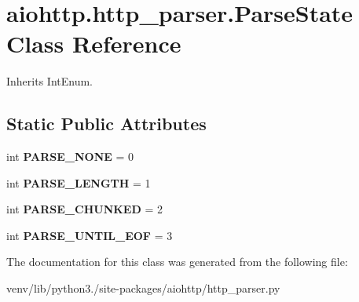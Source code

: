 \hypertarget{classaiohttp_1_1http__parser_1_1_parse_state}{}\section{aiohttp.\+http\+\_\+parser.\+Parse\+State Class Reference}
\label{classaiohttp_1_1http__parser_1_1_parse_state}


Inherits Int\+Enum.

\subsection*{Static Public Attributes}
\begin{DoxyCompactItemize}
\item 
\mbox{\label{classaiohttp_1_1http__parser_1_1_parse_state_a7d81ed0e03e3556e5d9611f1b1e2e6ba}} 
int {\bfseries P\+A\+R\+S\+E\+\_\+\+N\+O\+NE} = 0
\item 
\mbox{\label{classaiohttp_1_1http__parser_1_1_parse_state_a39a88e78db18fcf547b1ff9e46424c58}} 
int {\bfseries P\+A\+R\+S\+E\+\_\+\+L\+E\+N\+G\+TH} = 1
\item 
\mbox{\label{classaiohttp_1_1http__parser_1_1_parse_state_a1f4d111ceee57b123abf0433104d811d}} 
int {\bfseries P\+A\+R\+S\+E\+\_\+\+C\+H\+U\+N\+K\+ED} = 2
\item 
\mbox{\label{classaiohttp_1_1http__parser_1_1_parse_state_a1640b917e6dec531e1b352b6a3aa08bb}} 
int {\bfseries P\+A\+R\+S\+E\+\_\+\+U\+N\+T\+I\+L\+\_\+\+E\+OF} = 3
\end{DoxyCompactItemize}


The documentation for this class was generated from the following file\+:\begin{DoxyCompactItemize}
\item 
venv/lib/python3./site-\/packages/aiohttp/http\+\_\+parser.\+py\end{DoxyCompactItemize}
